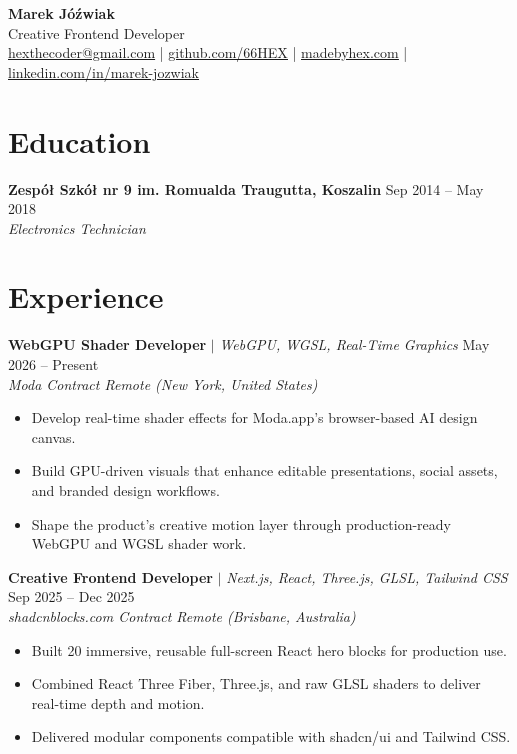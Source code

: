 \documentclass[10pt,a4paper]{article}
\let\oldhref\href
\renewcommand{\href}[2]{\oldhref{#1}{\uline{#2}}}
\begin{document}
\begin{center}
  {\huge \textbf{Marek Jóźwiak}}\\[4pt]
  {\large Creative Frontend Developer}\\[8pt]
  \small
  \href{mailto:hexthecoder@gmail.com}{hexthecoder@gmail.com}
  \quad|\quad
  \href{https://github.com/66HEX}{github.com/66HEX}
  \quad|\quad
  \href{https://www.madebyhex.com/}{madebyhex.com}
  \quad|\quad
  \href{https://www.linkedin.com/in/marek-j\%C3\%B3\%C5\%BAwiak-29958132a/}{linkedin.com/in/marek-jozwiak}
\end{center}
\vspace{6pt}

\section{Education}

\textbf{Zespół Szkół nr 9 im. Romualda Traugutta, Koszalin} \hfill Sep 2014 -- May 2018\\
\textit{Electronics Technician}

\section{Experience}

\textbf{WebGPU Shader Developer} $|$ \textit{WebGPU, WGSL, Real-Time Graphics} \hfill May 2026 -- Present\\
\textit{Moda \textbar{} Contract \textbar{} Remote (New York, United States)}
\begin{itemize}
  \item Develop real-time shader effects for Moda.app's browser-based AI design canvas.
  \item Build GPU-driven visuals that enhance editable presentations, social assets, and branded design workflows.
  \item Shape the product's creative motion layer through production-ready WebGPU and WGSL shader work.
\end{itemize}

\textbf{Creative Frontend Developer} $|$ \textit{Next.js, React, Three.js, GLSL, Tailwind CSS} \hfill Sep 2025 -- Dec 2025\\
\textit{shadcnblocks.com \textbar{} Contract \textbar{} Remote (Brisbane, Australia)}
\begin{itemize}
  \item Built 20 immersive, reusable full-screen React hero blocks for production use.
  \item Combined React Three Fiber, Three.js, and raw GLSL shaders to deliver real-time depth and motion.
  \item Delivered modular components compatible with shadcn/ui and Tailwind CSS.
\end{itemize}
\end{document}
